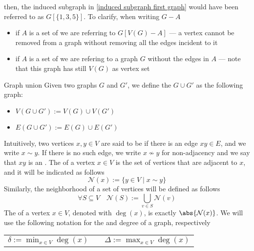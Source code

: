 \documentclass[a4paper, 12pt]{report}
\begin{document}
    then, the induced subgraph in \cref{induced subgraph first graph} would have been referred to as $G[\{1, 3, 5\}]$. To clarify, when writing $G - A$

    \begin{itemize}
        \item if $A$ is a set of  we are referring to $G[V(G) - A]$ --- a vertex cannot be removed from a graph without removing all the edges incident to it
        \item if $A$ is a set of  we are refering to a graph $G$ without the edges in $A$ --- note that this graph has still $V(G)$ as vertex set
    \end{itemize}

    \begin{frameddefn}{Graph union}
        Given two graphs $G$ and $G'$, we define the  $G \cup G'$ as the following graph:

        \begin{itemize}
            \item $V(G \cup G') := V(G) \cup V(G')$
            \item $E(G \cup G') := E(G) \cup E(G')$ 
        \end{itemize}
    \end{frameddefn}

    Intuitively, two vertices $x, y \in V$ are said to be  if there is an edge $xy \in E$, and we write $x \sim y$. If there is no such edge, we write $x \nsim y$ for non-adjacency and we say that $xy$ is an . The  of a vertex $x \in V$ is the set of vertices that are adjacent to $x$, and it will be indicated as follows $$\mathcal N (x) := \{y \in V \mid x \sim y\}$$ Similarly, the neighborhood of a set of vertices will be defined as follows $$\forall S \subseteq V \quad \mathcal N(S) := \bigcup_{v \in S}{\mathcal N (v)}$$ The  of a vertex $x \in V$, denoted with $\deg(x)$, is exactly $\abs{\mathcal N (x)}$. We will use the following notation for the  and  degree of a graph, respectively

    \begin{center}
        \begin{tabular}{ccc}
            $\displaystyle \delta := \min_{x \in V}{\deg(x)}$ & \qquad & $\displaystyle \Delta := \max_{x \in V}{\deg(x)}$
        \end{tabular}
    \end{center}
\end{document}
